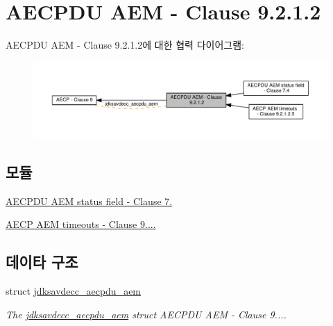 \hypertarget{group__aecpdu__aem}{}\section{A\+E\+C\+P\+DU A\+EM -\/ Clause 9.2.1.2}
\label{group__aecpdu__aem}
A\+E\+C\+P\+DU A\+EM -\/ Clause 9.2.1.2에 대한 협력 다이어그램\+:
\nopagebreak
\begin{figure}[H]
\begin{center}
\leavevmode
\includegraphics[width=350pt]{group__aecpdu__aem}
\end{center}
\end{figure}
\subsection*{모듈}
\begin{DoxyCompactItemize}
\item 
\hyperlink{group__aecpdu__aem__status}{A\+E\+C\+P\+D\+U A\+E\+M status field -\/ Clause 7.}
\item 
\hyperlink{group__aecpdu__aem__timeouts}{A\+E\+C\+P A\+E\+M timeouts -\/ Clause 9....}
\end{DoxyCompactItemize}
\subsection*{데이타 구조}
\begin{DoxyCompactItemize}
\item 
struct \hyperlink{structjdksavdecc__aecpdu__aem}{jdksavdecc\+\_\+aecpdu\+\_\+aem}
\begin{DoxyCompactList}\small\item\em The \hyperlink{structjdksavdecc__aecpdu__aem}{jdksavdecc\+\_\+aecpdu\+\_\+aem} struct A\+E\+C\+P\+DU A\+EM -\/ Clause 9.... \end{DoxyCompactList}\end{DoxyCompactItemize}
